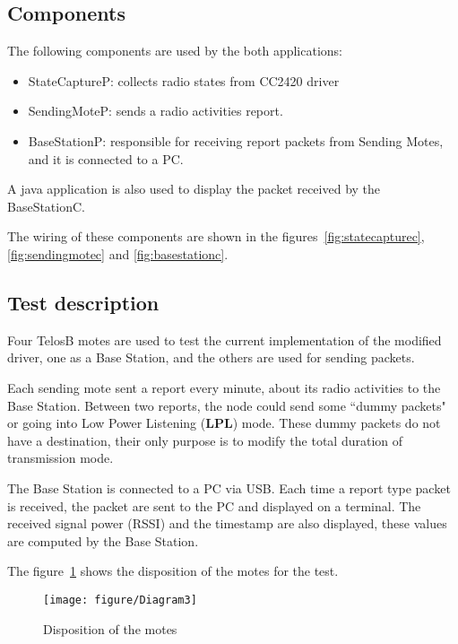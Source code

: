 \documentclass[a4paper,11pt]{article}
\begin{document}
  \subsection{Components}

The following components are used by the both applications:

  \begin{itemize}
    \item StateCaptureP: collects radio states from CC2420 driver
    \item SendingMoteP: sends a radio activities report.
    \item BaseStationP: responsible for receiving report packets from Sending Motes, and it is connected to a PC.
  \end{itemize}

A java application is also used to display the packet received by the BaseStationC.

The wiring of these components are shown in the figures~\ref{fig:statecapturec}, \ref{fig:sendingmotec} and \ref{fig:basestationc}.

  \subsection{Test description}

Four TelosB motes are used to test the current implementation of the modified driver, one as a Base Station, and the others are used for sending packets.

Each sending mote sent a report every minute, about its radio activities to the Base Station. Between two reports, the node could send some ``dummy packets" or going into Low Power Listening (\textbf{LPL}) mode.
These dummy packets do not have a destination, their only purpose is to modify the total duration of transmission mode.

The Base Station is connected to a PC via USB. Each time a report type packet is received, the packet are sent to the PC and displayed on a terminal. The received signal power (RSSI) and the timestamp are also displayed, these values are computed by the Base Station.

The figure~\ref{fig:testbench} shows the disposition of the motes for the test.

  \begin{figure}[here]
    \centering
    \texttt{[image: figure/Diagram3]}
    \caption{Disposition of the motes}
    \label{fig:testbench}
  \end{figure}
\end{document}

